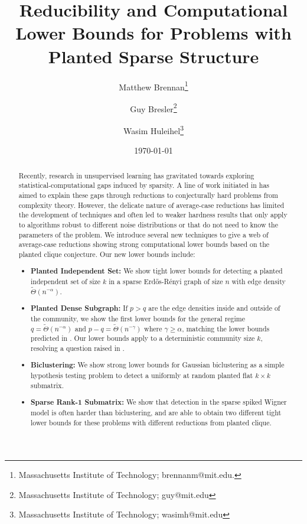 \documentclass[11pt]{article}
\begin{document}
\title{Reducibility and Computational Lower Bounds for Problems with Planted Sparse Structure}

\author{Matthew Brennan\thanks{Massachusetts Institute of Technology; brennanm@mit.edu.}
\and 
Guy Bresler\thanks{Massachusetts Institute of Technology; guy@mit.edu}
\and
Wasim Huleihel\thanks{Massachusetts Institute of Technology; wasimh@mit.edu}}
\date{\today}

\maketitle

\begin{abstract}
Recently, research in unsupervised learning has gravitated towards exploring statistical-computational gaps induced by sparsity. A line of work initiated in \cite{berthet2013complexity} has aimed to explain these gaps through reductions to conjecturally hard problems from complexity theory. However, the delicate nature of average-case reductions has limited the development of techniques and often led to weaker hardness results that only apply to algorithms robust to different noise distributions or that do not need to know the parameters of the problem. We introduce several new techniques to give a web of average-case reductions showing strong computational lower bounds based on the planted clique conjecture. Our new lower bounds include:
\begin{itemize}
\item \textbf{Planted Independent Set:} We show tight lower bounds for detecting a planted independent set of size $k$ in a sparse Erd\H{o}s-R\'{e}nyi graph of size $n$ with edge density $\tilde{\Theta}(n^{-\alpha})$.
\item \textbf{Planted Dense Subgraph:} If $p > q$ are the edge densities inside and outside of the community, we show the first lower bounds for the general regime $q = \tilde{\Theta}(n^{-\alpha})$ and $p - q = \tilde{\Theta}(n^{-\gamma})$ where $\gamma \ge \alpha$, matching the lower bounds predicted in \cite{chen2016statistical}. Our lower bounds apply to a deterministic community size $k$, resolving a question raised in \cite{hajek2015computational}.
\item \textbf{Biclustering:} We show strong lower bounds for Gaussian biclustering as a simple hypothesis testing problem to detect a uniformly at random planted flat $k \times k$ submatrix.
\item \textbf{Sparse Rank-1 Submatrix:} We show that detection in the sparse spiked Wigner model is often harder than biclustering, and are able to obtain two different tight lower bounds for these problems with different reductions from planted clique.

\end{itemize}
\end{abstract}
\end{document}
